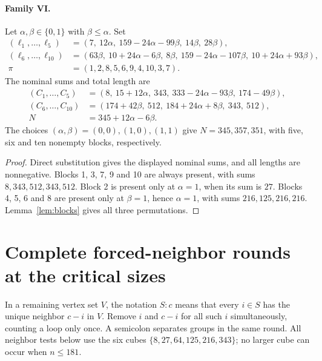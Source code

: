 \paragraph{Family VI.}
Let $\alpha,\beta\in\{0,1\}$ with $\beta\le\alpha$. Set
\[
\begin{aligned}
(\ell_1,\ldots,\ell_5)
 &= (7,\ 12\alpha,\ 159-24\alpha-99\beta,\ 14\beta,\ 28\beta),\\
(\ell_6,\ldots,\ell_{10})
 &= (63\beta,\ 10+24\alpha-6\beta,\ 8\beta,\ 159-24\alpha-107\beta,
       \ 10+24\alpha+93\beta),\\
\pi&=(1,2,8,5,6,9,4,10,3,7).
\end{aligned}
\]
The nominal sums and total length are
\[
\begin{aligned}
(C_1,\ldots,C_5)&=(8,\ 15+12\alpha,\ 343,\ 333-24\alpha-93\beta,\ 174-49\beta),\\
(C_6,\ldots,C_{10})&=(174+42\beta,\ 512,\ 184+24\alpha+8\beta,\ 343,\ 512),\\
N&=345+12\alpha-6\beta.
\end{aligned}
\]
The choices $(\alpha,\beta)=(0,0),(1,0),(1,1)$ give
$N=345,357,351$, with five, six and ten nonempty blocks, respectively.
\begin{proof}
Direct substitution gives the displayed nominal sums, and all lengths are
nonnegative. Blocks 1, 3, 7, 9 and 10 are always present, with sums
$8,343,512,343,512$. Block 2 is present only at $\alpha=1$, when its
sum is $27$. Blocks 4, 5, 6 and 8 are present only at $\beta=1$,
hence $\alpha=1$, with sums $216,125,216,216$.
Lemma~\ref{lem:blocks} gives all three permutations.
\end{proof}

\section{Complete forced-neighbor rounds at the critical sizes}\label{app:peeling}
In a remaining vertex set $V$, the notation $S:c$ means that every
$i\in S$ has the unique neighbor $c-i$ in $V$. Remove $i$ and $c-i$
for all such $i$ simultaneously, counting a loop only once.
A semicolon separates groups in the same round.
All neighbor tests below use the six cubes
$\{8,27,64,125,216,343\}$; no larger cube can occur when $n\le181$.

